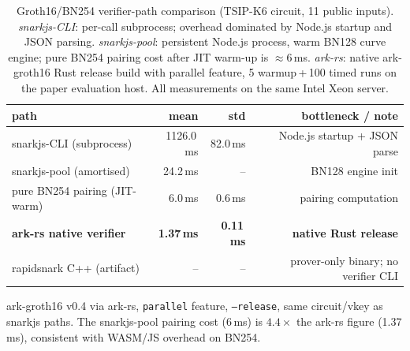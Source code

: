 \begin{table}[t]
\centering
\caption{Groth16/BN254 verifier-path comparison (TSIP-K6 circuit, 11 public
inputs). \emph{snarkjs-CLI}: per-call subprocess; overhead dominated by Node.js
startup and JSON parsing. \emph{snarkjs-pool}: persistent Node.js process,
warm BN128 curve engine; pure BN254 pairing cost after JIT warm-up is
$\approx$6\,ms. \emph{ark-rs}: native ark-groth16 Rust release build with
parallel feature, 5 warmup\,+\,100 timed runs on the paper evaluation host.
All measurements on the same Intel Xeon server.}
\label{tab:verifier-path}
\scriptsize
\setlength{\tabcolsep}{3pt}
\begin{tabularx}{\columnwidth}{@{}l r r r@{}}
\toprule
path & mean & std & bottleneck / note \\
\midrule
snarkjs-CLI (subprocess)               & 1126.0\,ms & 82.0\,ms & Node.js startup + JSON parse \\
snarkjs-pool (amortised)               &   24.2\,ms &     --   & BN128 engine init \\
\quad pure BN254 pairing (JIT-warm)    &    6.0\,ms &  0.6\,ms & pairing computation \\
\textbf{ark-rs native verifier}       & \textbf{1.37\,ms} & \textbf{0.11\,ms} & \textbf{native Rust release} \\
rapidsnark C++ (artifact)              &     --     &     --   & prover-only binary; no verifier CLI \\
\bottomrule
\end{tabularx}
{\footnotesize ark-groth16 v0.4 via ark-rs, \texttt{parallel} feature, \texttt{--release},
same circuit/vkey as snarkjs paths.
The snarkjs-pool pairing cost (6\,ms) is $4.4\times$ the ark-rs
figure (1.37\,ms), consistent with WASM/JS overhead on BN254.}
\end{table}
